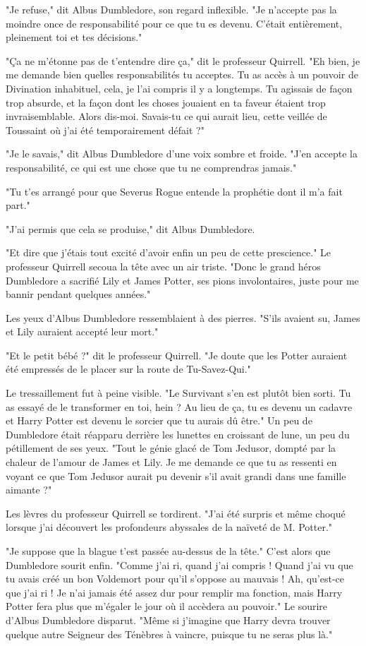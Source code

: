 "Je refuse," dit Albus Dumbledore, son regard inflexible. "Je n'accepte pas la moindre once de responsabilité pour ce que tu es devenu. C'était entièrement, pleinement toi et tes décisions."

"Ça ne m'étonne pas de t'entendre dire ça," dit le professeur Quirrell. "Eh bien, je me demande bien quelles responsabilités tu acceptes. Tu as accès à un pouvoir de Divination inhabituel, cela, je l'ai compris il y a longtemps. Tu agissais de façon trop absurde, et la façon dont les choses jouaient en ta faveur étaient trop invraisemblable. Alors dis-moi. Savais-tu ce qui aurait lieu, cette veillée de Toussaint où j'ai été temporairement défait ?"

"Je le savais," dit Albus Dumbledore d'une voix sombre et froide. "J'en accepte la responsabilité, ce qui est une chose que tu ne comprendras jamais."

"Tu t'es arrangé pour que Severus Rogue entende la prophétie dont il m'a fait part."

"J'ai permis que cela se produise," dit Albus Dumbledore.

"Et dire que j'étais tout excité d'avoir enfin un peu de cette prescience." Le professeur Quirrell secoua la tête avec un air triste. "Donc le grand héros Dumbledore a sacrifié Lily et James Potter, ses pions involontaires, juste pour me bannir pendant quelques années."

Les yeux d'Albus Dumbledore ressemblaient à des pierres. "S'ils avaient su, James et Lily auraient accepté leur mort."

"Et le petit bébé ?" dit le professeur Quirrell. "Je doute que les Potter auraient été empressés de le placer sur la route de Tu-Savez-Qui."

Le tressaillement fut à peine visible. "Le Survivant s'en est plutôt bien sorti. Tu as essayé de le transformer en toi, hein ? Au lieu de ça, tu es devenu un cadavre et Harry Potter est devenu le sorcier que tu aurais dû être." Un peu de Dumbledore était réapparu derrière les lunettes en croissant de lune, un peu du pétillement de ses yeux. "Tout le génie glacé de Tom Jedusor, dompté par la chaleur de l'amour de James et Lily. Je me demande ce que tu as ressenti en voyant ce que Tom Jedusor aurait pu devenir s'il avait grandi dans une famille aimante ?"

Les lèvres du professeur Quirrell se tordirent. "J'ai été surpris et même choqué lorsque j'ai découvert les profondeurs abyssales de la naïveté de M. Potter."

"Je suppose que la blague t'est passée au-dessus de la tête." C'est alors que Dumbledore sourit enfin. "Comme j'ai ri, quand j'ai compris ! Quand j'ai vu que tu avais créé un bon Voldemort pour qu'il s'oppose au mauvais ! Ah, qu'est-ce que j'ai ri ! Je n'ai jamais été assez dur pour remplir ma fonction, mais Harry Potter fera plus que m'égaler le jour où il accèdera au pouvoir." Le sourire d'Albus Dumbledore disparut. "Même si j'imagine que Harry devra trouver quelque autre Seigneur des Ténèbres à vaincre, puisque tu ne seras plus là."

